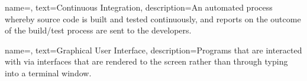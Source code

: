 
{
name=,
text=Continuous Integration,
description={An automated process whereby source code is built and tested continuously, and reports on the outcome of the build/test process are sent to the developers.}
}


{
name=,
text=Graphical User Interface,
description={Programs that are interacted with via interfaces that are rendered to the screen rather than through typing into a terminal window.}
}

